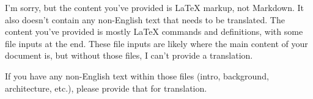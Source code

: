I'm sorry, but the content you've provided is LaTeX markup, not Markdown. It also doesn't contain any non-English text that needs to be translated. The content you've provided is mostly LaTeX commands and definitions, with some file inputs at the end. These file inputs are likely where the main content of your document is, but without those files, I can't provide a translation. 

If you have any non-English text within those files (intro, background, architecture, etc.), please provide that for translation.
